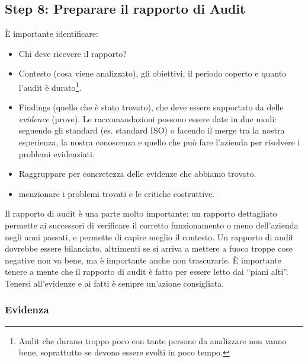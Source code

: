 \subsection{Step 8: Preparare il rapporto di Audit}

È importante identificare:
\begin{itemize}
\item Chi deve ricevere il rapporto?
\item Contesto (cosa viene analizzato), gli obiettivi, il periodo coperto e quanto l'audit è durato\footnote{Audit che durano troppo poco con tante persone da analizzare non vanno bene, soprattutto se devono essere svolti in poco tempo.}.
\item Findings (quello che è stato trovato), che deve essere supportato da delle \emph{evidence} (prove). Le raccomandazioni possono essere date in due modi: seguendo gli standard (es. standard ISO) o facendo il merge tra la nostra esperienza, la nostra conoscenza e quello che può fare l'azienda per risolvere i problemi evidenziati.
\item Raggruppare per concretezza delle evidenze che abbiamo trovato.
\item menzionare i problemi trovati e le critiche costruttive.
\end{itemize}

Il rapporto di audit è una parte molto importante: un rapporto dettagliato permette ai successori di verificare il corretto funzionamento o meno dell'azienda negli anni passati, e permette di capire meglio il contesto. Un rapporto di audit dovrebbe essere bilanciato, altrimenti se si arriva a mettere a fuoco troppe cose negative non va bene, ma è importante anche non trascurarle. È importante tenere a mente che il rapporto di audit è fatto per essere letto dai ``piani alti''. Tenersi all'evidenze e ai fatti è sempre un'azione consigliata.






\subsubsection{Evidenza}

